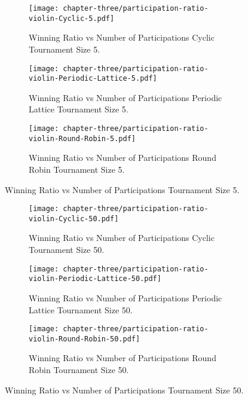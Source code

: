 \begin{figure}[H]
\centering

    \begin{subfigure}[t]{0.75\textwidth}
    \centering
        \texttt{[image: chapter-three/participation-ratio-violin-Cyclic-5.pdf]}
    \caption{Winning Ratio vs Number of Participations Cyclic Tournament Size 5.}
    \end{subfigure}
\hfill
    \begin{subfigure}[t]{0.75\textwidth}\centering
    \centering
        \texttt{[image: chapter-three/participation-ratio-violin-Periodic-Lattice-5.pdf]}
    \caption{Winning Ratio vs Number of Participations Periodic Lattice Tournament Size 5.}
    \end{subfigure}
\hfill
    \begin{subfigure}[t]{0.75\textwidth}\centering
    \centering
        \texttt{[image: chapter-three/participation-ratio-violin-Round-Robin-5.pdf]}
    \caption{Winning Ratio vs Number of Participations Round Robin Tournament Size 5.}
    \end{subfigure}
\caption{Winning Ratio vs Number of Participations Tournament Size 5.}
\label{fig:winning-ratio-participations-five}
\end{figure}

\begin{figure}[H]
\centering

    \begin{subfigure}[t]{0.75\textwidth}
    \centering
        \texttt{[image: chapter-three/participation-ratio-violin-Cyclic-50.pdf]}
    \caption{Winning Ratio vs Number of Participations Cyclic Tournament Size 50.}
    \end{subfigure}
\hfill
    \begin{subfigure}[t]{0.75\textwidth}\centering
    \centering
        \texttt{[image: chapter-three/participation-ratio-violin-Periodic-Lattice-50.pdf]}
    \caption{Winning Ratio vs Number of Participations Periodic Lattice Tournament Size 50.}
    \end{subfigure}
\hfill
    \begin{subfigure}[t]{0.75\textwidth}\centering
    \centering
        \texttt{[image: chapter-three/participation-ratio-violin-Round-Robin-50.pdf]}
    \caption{Winning Ratio vs Number of Participations Round Robin Tournament Size 50.}
    \end{subfigure}
\caption{Winning Ratio vs Number of Participations Tournament Size 50.}
\label{fig:winning-ratio-participations-fifty}
\end{figure}

